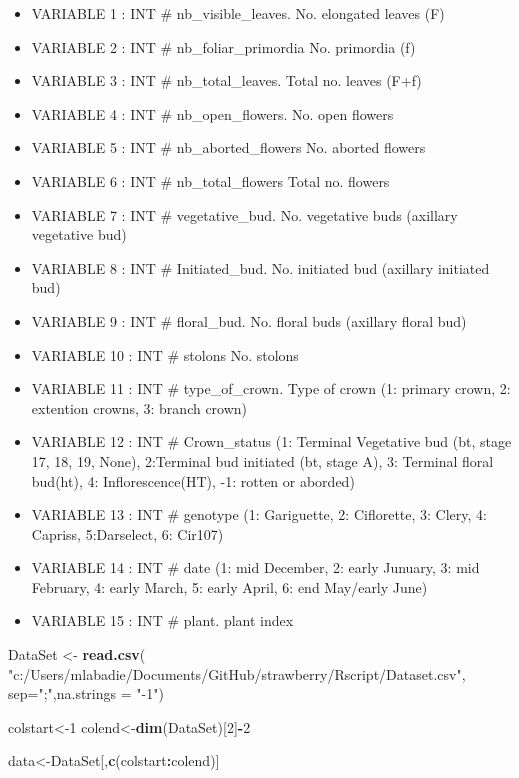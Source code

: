 \documentclass[]{article}
\newenvironment{Shaded}{\begin{snugshade}}{\end{snugshade}}
\newcommand{\KeywordTok}[1]{\textcolor[rgb]{0.13,0.29,0.53}{\textbf{#1}}}
\newcommand{\DataTypeTok}[1]{\textcolor[rgb]{0.13,0.29,0.53}{#1}}
\newcommand{\DecValTok}[1]{\textcolor[rgb]{0.00,0.00,0.81}{#1}}
\newcommand{\StringTok}[1]{\textcolor[rgb]{0.31,0.60,0.02}{#1}}
\newcommand{\OperatorTok}[1]{\textcolor[rgb]{0.81,0.36,0.00}{\textbf{#1}}}
\newcommand{\NormalTok}[1]{#1}
\providecommand{\tightlist}{%
  \setlength{\itemsep}{0pt}\setlength{\parskip}{0pt}}
\begin{document}
\begin{itemize}
\tightlist
\item
  VARIABLE 1 : INT \# nb\_visible\_leaves. No. elongated leaves (F)
\item
  VARIABLE 2 : INT \# nb\_foliar\_primordia No. primordia (f)
\item
  VARIABLE 3 : INT \# nb\_total\_leaves. Total no. leaves (F+f)
\item
  VARIABLE 4 : INT \# nb\_open\_flowers. No. open flowers
\item
  VARIABLE 5 : INT \# nb\_aborted\_flowers No. aborted flowers
\item
  VARIABLE 6 : INT \# nb\_total\_flowers Total no. flowers
\item
  VARIABLE 7 : INT \# vegetative\_bud. No. vegetative buds (axillary
  vegetative bud)
\item
  VARIABLE 8 : INT \# Initiated\_bud. No. initiated bud (axillary
  initiated bud)
\item
  VARIABLE 9 : INT \# floral\_bud. No. floral buds (axillary floral bud)
\item
  VARIABLE 10 : INT \# stolons No. stolons
\item
  VARIABLE 11 : INT \# type\_of\_crown. Type of crown (1: primary crown,
  2: extention crowns, 3: branch crown)
\item
  VARIABLE 12 : INT \# Crown\_status (1: Terminal Vegetative bud (bt,
  stage 17, 18, 19, None), 2:Terminal bud initiated (bt, stage A), 3:
  Terminal floral bud(ht), 4: Inflorescence(HT), -1: rotten or aborded)
\item
  VARIABLE 13 : INT \# genotype (1: Gariguette, 2: Ciflorette, 3: Clery,
  4: Capriss, 5:Darselect, 6: Cir107)
\item
  VARIABLE 14 : INT \# date (1: mid December, 2: early Junuary, 3: mid
  February, 4: early March, 5: early April, 6: end May/early June)
\item
  VARIABLE 15 : INT \# plant. plant index
\end{itemize}

\begin{Shaded}
\begin{Highlighting}[]
\NormalTok{DataSet <-}\StringTok{ }\KeywordTok{read.csv}\NormalTok{(}
  \StringTok{"c:/Users/mlabadie/Documents/GitHub/strawberry/Rscript/Dataset.csv"}\NormalTok{, }
  \DataTypeTok{sep=}\StringTok{";"}\NormalTok{,}\DataTypeTok{na.strings =} \StringTok{"-1"}\NormalTok{)}

\NormalTok{colstart<-}\DecValTok{1}
\NormalTok{colend<-}\KeywordTok{dim}\NormalTok{(DataSet)[}\DecValTok{2}\NormalTok{]}\OperatorTok{-}\DecValTok{2}

\NormalTok{data<-DataSet[,}\KeywordTok{c}\NormalTok{(colstart}\OperatorTok{:}\NormalTok{colend)]}
\end{Highlighting}
\end{Shaded}
\end{document}
